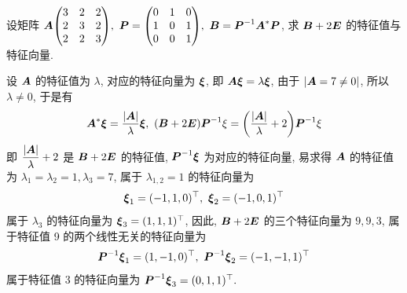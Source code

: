 \begin{example}
    设矩阵 $\vb*{A}\mqty(3&2&2\\2&3&2\\2&2&3),~\vb*{P}=\mqty(0&1&0\\1&0&1\\0&0&1),~\vb*{B}=\vb*{P}^{-1}\vb*{A}^*\vb*{P}$, 求 $\vb*{B}+2\vb*{E}$ 的特征值与特征向量.
\end{example}
\begin{solution}
    设 $\vb*{A}$ 的特征值为 $\lambda$, 对应的特征向量为 $\vb*{\xi}$, 即 $\vb*{A\xi}=\lambda\vb*{\xi}$, 由于 $|\vb*{A}=7\neq0|$, 所以 $\lambda\neq0$, 于是有 
    $$\vb*{A}^*\vb*{\xi}=\dfrac{|\vb*{A}|}{\lambda}\vb*{\xi},~(\vb*{B}+2\vb*{E})\vb*{P}^{-1}\xi=\qty(\dfrac{|\vb*{A}|}{\lambda}+2)\vb*{P}^{-1}\xi$$
    即 $\dfrac{|\vb*{A}|}{\lambda}+2$ 是 $\vb*{B}+2\vb*{E}$ 的特征值, $\vb*{P}^{-1}\vb*{\xi}$ 为对应的特征向量, 
    易求得 $\vb*{A}$ 的特征值为 $\lambda_1=\lambda_2=1,\lambda_3=7$, 属于 $\lambda_{1,2}=1$ 的特征向量为 
    $$\vb*{\xi}_1=(-1,1,0)^\top,~\vb*{\xi}_2=(-1,0,1)^\top$$
    属于 $\lambda_3$ 的特征向量为 $\vb*{\xi}_3=(1,1,1)^\top$, 因此, $\vb*{B}+2\vb*{E}$ 的三个特征向量为 $9,9,3$, 属于特征值 9 的两个线性无关的特征向量为 
    $$\vb*{P}^{-1}\vb*{\xi}_1=(1,-1,0)^\top,~\vb*{P}^{-1}\vb*{\xi}_2=(-1,-1,1)^\top$$
    属于特征值 3 的特征向量为 $\vb*{P}^{-1}\vb*{\xi}_3=(0,1,1)^\top.$
\end{solution}

